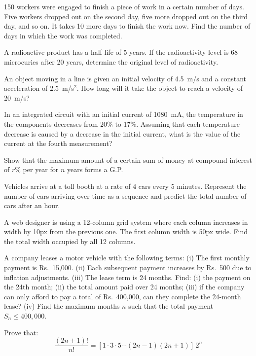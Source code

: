 \documentclass[11pt,a4paper]{article}
\begin{document}
\begin{longlist}
\item 150 workers were engaged to finish a piece of work in a certain number of days. Five workers dropped out on the second day, five more dropped out on the third day, and so on. It takes 10 more days to finish the work now. Find the number of days in which the work was completed.

\item A radioactive product has a half-life of 5 years. If the radioactivity level is 68 microcuries after 20 years, determine the original level of radioactivity.

\item An object moving in a line is given an initial velocity of 4.5~m/s and a constant acceleration of $2.5$~m/s$^2$. How long will it take the object to reach a velocity of 20~m/s?

\item In an integrated circuit with an initial current of 1080~mA, the temperature in the components decreases from 20\% to 17\%. Assuming that each temperature decrease is caused by a decrease in the initial current, what is the value of the current at the fourth measurement?

\item Show that the maximum amount of a certain sum of money at compound interest of $r\%$ per year for $n$ years forms a G.P.

\item Vehicles arrive at a toll booth at a rate of 4 cars every 5 minutes. Represent the number of cars arriving over time as a sequence and predict the total number of cars after an hour.

\item A web designer is using a 12-column grid system where each column increases in width by 10px from the previous one. The first column width is 50px wide. Find the total width occupied by all 12 columns.

\item A company leases a motor vehicle with the following terms: (i) The first monthly payment is Rs.~15,000. (ii) Each subsequent payment increases by Rs.~500 due to inflation adjustments. (iii) The lease term is 24 months. Find: (i) the payment on the 24th month; (ii) the total amount paid over 24 months; (iii) if the company can only afford to pay a total of Rs.~400,000, can they complete the 24-month lease? (iv) Find the maximum months $n$ such that the total payment $S_n \le 400{,}000$.

\item Prove that:
\[
\frac{(2n+1)!}{n!}=[1\cdot3\cdot5\cdots(2n-1)(2n+1)]\,2^n
\]


\end{longlist}
\end{document}

